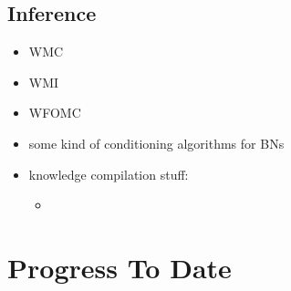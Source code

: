 \documentclass{article}
\begin{document}
\subsection{Inference}

\begin{itemize}
\item WMC \cite{DBLP:journals/ai/ChaviraD08}
\item WMI \cite{DBLP:conf/ijcai/BellePB15}
\item WFOMC \cite{DBLP:journals/cacm/GogateD16,DBLP:conf/ijcai/BroeckTMDR11}
\item some kind of conditioning algorithms for BNs
\item knowledge compilation stuff:
  \begin{itemize}
  \item 
  \end{itemize}
\end{itemize} %

\section{Progress To Date}
\end{document}
